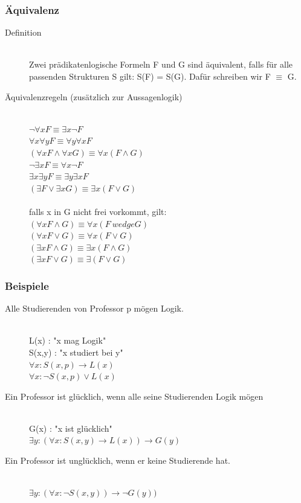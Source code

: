 \documentclass[a4paper,10pt]{article}
\newcommand{\ra}{\rightarrow}
\begin{document}
\subsubsection{\"Aquivalenz}
\begin{description}
	\item[Definition] \hfill \\
		Zwei pr\"adikatenlogische Formeln F und G sind \"aquivalent, falls f\"ur alle passenden Strukturen S gilt: S(F) = S(G). Daf\"ur schreiben wir F $\equiv$ G.
	\item[\"Aquivalenzregeln (zus\"atzlich zur Aussagenlogik)] \hfill \\
		$\neg \forall x F \equiv \exists x \neg F$ \\
		$\forall x \forall y F \equiv \forall y \forall x F$ \\
		$(\forall x F \wedge \forall x G) \equiv \forall x (F \wedge G)$ \\
		$\neg \exists x F \equiv \forall x \neg F$ \\		
		$\exists x \exists y F \equiv \exists y \exists x F$ \\
		$(\exists F \vee \exists x G) \equiv \exists x (F \vee G)$ \\ \\
		falls x in G nicht frei vorkommt, gilt: \\
		$(\forall x F \wedge G) \equiv \forall x (F \ wedge G)$ \\
		$(\forall x F \vee G) \equiv \forall x (F \vee G)$ \\
		$(\exists x F \wedge G) \equiv \exists x (F \wedge G)$ \\
		$(\exists x F \vee G) \equiv \exists (F \vee G)$ \\
\end{description}

\subsubsection{Beispiele}
\begin{description}
	\item[Alle Studierenden von Professor p m\"ogen Logik.] \hfill \\
		L(x) : "x mag Logik" \\
		S(x,y) : "x studiert bei y" \\
		$\forall x: S(x,p) \ra L(x)$ \\
		$\forall x: \neg S(x,p) \vee L(x)$
	\item[Ein Professor ist gl\"ucklich, wenn alle seine Studierenden Logik m\"ogen] \hfill \\
		G(x) : "x ist gl\"ucklich" \\
		$\exists y: (\forall x : S(x,y) \ra L(x)) \ra G(y)$
	\item[Ein Professor ist ungl\"ucklich, wenn er keine Studierende hat.] \hfill \\
		$\exists y: (\forall x : \neg S(x,y)) \ra \neg G(y))$
\end{description}
\end{document}
